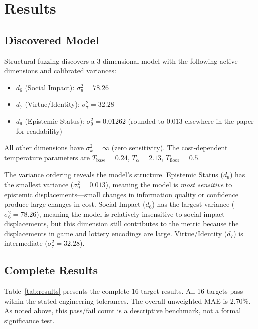 \documentclass[journal]{IEEEtran}
\begin{document}
\section{Results}
\label{sec:results}

\subsection{Discovered Model}

Structural fuzzing discovers a 3-dimensional model with the following active dimensions and calibrated variances:
\begin{itemize}
    \item $d_6$ (Social Impact): $\sigma_6^2 = 78.26$
    \item $d_7$ (Virtue/Identity): $\sigma_7^2 = 32.28$
    \item $d_9$ (Epistemic Status): $\sigma_9^2 = 0.01262$ (rounded to $0.013$ elsewhere in the paper for readability)
\end{itemize}
All other dimensions have $\sigma_k^2 = \infty$ (zero sensitivity).
The cost-dependent temperature parameters are $T_{\text{base}} = 0.24$, $T_\alpha = 2.13$, $T_{\text{floor}} = 0.5$.

The variance ordering reveals the model's structure.
Epistemic Status ($d_9$) has the smallest variance ($\sigma_9^2 = 0.013$), meaning the model is \emph{most sensitive} to epistemic displacements---small changes in information quality or confidence produce large changes in cost.
Social Impact ($d_6$) has the largest variance ($\sigma_6^2 = 78.26$), meaning the model is relatively insensitive to social-impact displacements, but this dimension still contributes to the metric because the displacements in game and lottery encodings are large.
Virtue/Identity ($d_7$) is intermediate ($\sigma_7^2 = 32.28$).

\subsection{Complete Results}

Table~\ref{tab:results} presents the complete 16-target results.
All 16 targets pass within the stated engineering tolerances.
The overall unweighted MAE is 2.70\%. As noted above, this pass/fail count is a descriptive benchmark, not a formal significance test.
\end{document}
